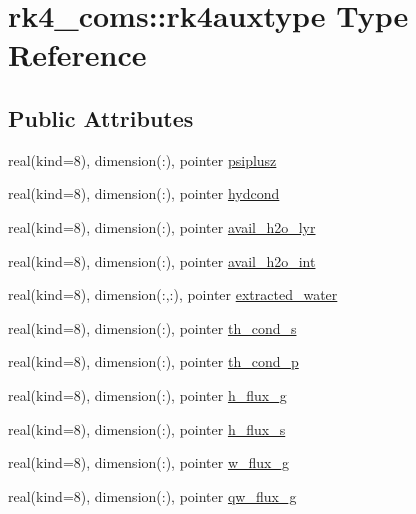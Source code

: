 \hypertarget{structrk4__coms_1_1rk4auxtype}{}\section{rk4\+\_\+coms\+:\+:rk4auxtype Type Reference}
\label{structrk4__coms_1_1rk4auxtype}
\subsection*{Public Attributes}
\begin{DoxyCompactItemize}
\item 
real(kind=8), dimension(\+:), pointer \hyperlink{structrk4__coms_1_1rk4auxtype_a1d1d5ef093745ce362ed8df8e2d2c6d1}{psiplusz}
\item 
real(kind=8), dimension(\+:), pointer \hyperlink{structrk4__coms_1_1rk4auxtype_aa979e41b7b3e38a4c46b8f4c648efc65}{hydcond}
\item 
real(kind=8), dimension(\+:), pointer \hyperlink{structrk4__coms_1_1rk4auxtype_a235232828ba00f9c4393b2c0172f92b7}{avail\+\_\+h2o\+\_\+lyr}
\item 
real(kind=8), dimension(\+:), pointer \hyperlink{structrk4__coms_1_1rk4auxtype_a8b0786f2d5fd70c605701d3e6abcdd5f}{avail\+\_\+h2o\+\_\+int}
\item 
real(kind=8), dimension(\+:,\+:), pointer \hyperlink{structrk4__coms_1_1rk4auxtype_a40b225abc98b342f89d9091e8e4a795e}{extracted\+\_\+water}
\item 
real(kind=8), dimension(\+:), pointer \hyperlink{structrk4__coms_1_1rk4auxtype_adbe58418107a9f022aa4ec6d3750e019}{th\+\_\+cond\+\_\+s}
\item 
real(kind=8), dimension(\+:), pointer \hyperlink{structrk4__coms_1_1rk4auxtype_a73dbe8480f8e37618760acc5ec3a2a1a}{th\+\_\+cond\+\_\+p}
\item 
real(kind=8), dimension(\+:), pointer \hyperlink{structrk4__coms_1_1rk4auxtype_a3a5b9aae7dcb9a177b367a8cb68a600f}{h\+\_\+flux\+\_\+g}
\item 
real(kind=8), dimension(\+:), pointer \hyperlink{structrk4__coms_1_1rk4auxtype_ab8c8840096f6fc896f29746ef17e3497}{h\+\_\+flux\+\_\+s}
\item 
real(kind=8), dimension(\+:), pointer \hyperlink{structrk4__coms_1_1rk4auxtype_a35a7768804c49946386dc93198567136}{w\+\_\+flux\+\_\+g}
\item 
real(kind=8), dimension(\+:), pointer \hyperlink{structrk4__coms_1_1rk4auxtype_a0403ec98af10a2b409687a37535ce2cc}{qw\+\_\+flux\+\_\+g}

\end{DoxyCompactItemize}

